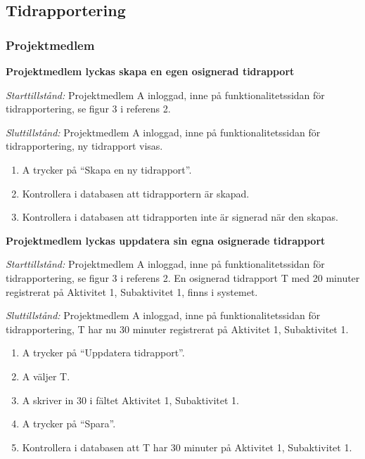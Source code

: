 \documentclass[a4paper]{article}
\begin{document}

\subsection{Tidrapportering}

\subsubsection{Projektmedlem}

\begin{FT}

\item\textbf{Projektmedlem lyckas skapa en egen osignerad tidrapport}

\emph{Starttillstånd:} Projektmedlem A inloggad, inne på funktionalitetssidan för tidrapportering, se figur 3 i referens 2.

\emph{Sluttillstånd:} Projektmedlem A inloggad, inne på funktionalitetssidan för tidrapportering, ny tidrapport visas.

\begin{enumerate}
\item A trycker på ``Skapa en ny tidrapport''.
\item Kontrollera i databasen att tidrapportern är skapad.
\item Kontrollera i databasen att tidrapporten inte är signerad när den skapas.
\end{enumerate}


\item\textbf{Projektmedlem lyckas uppdatera sin egna osignerade tidrapport}

\emph{Starttillstånd:} Projektmedlem A inloggad, inne på funktionalitetssidan för tidrapportering, se figur 3 i referens 2. En osignerad tidrapport T med 20 minuter registrerat på Aktivitet 1, Subaktivitet 1, finns i systemet.

\emph{Sluttillstånd:} Projektmedlem A inloggad, inne på funktionalitetssidan för tidrapportering, T har nu 30 minuter registrerat på Aktivitet 1, Subaktivitet 1.

\begin{enumerate}
\item A trycker på ``Uppdatera tidrapport''.
\item A väljer T.
\item A skriver in 30 i fältet Aktivitet 1, Subaktivitet 1.
\item A trycker på ``Spara''.
\item Kontrollera i databasen att T har 30 minuter på Aktivitet 1, Subaktivitet 1.
\end{enumerate}



\end{FT}
\end{document}
